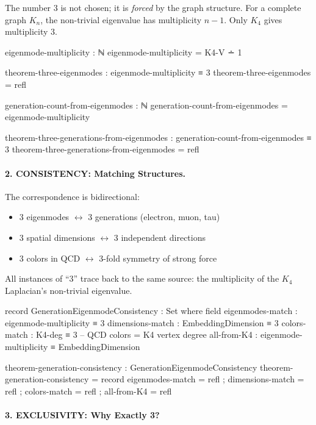 \documentclass[11pt,a4paper]{book}
\begin{document}
The number 3 is not chosen; it is \emph{forced} by the graph structure. For a complete graph $K_n$, the non-trivial eigenvalue has multiplicity $n-1$. Only $K_4$ gives multiplicity 3.

\begin{code}
eigenmode-multiplicity : ℕ
eigenmode-multiplicity = K4-V ∸ 1

theorem-three-eigenmodes : eigenmode-multiplicity ≡ 3
theorem-three-eigenmodes = refl

generation-count-from-eigenmodes : ℕ
generation-count-from-eigenmodes = eigenmode-multiplicity

theorem-three-generations-from-eigenmodes : generation-count-from-eigenmodes ≡ 3
theorem-three-generations-from-eigenmodes = refl
\end{code}

\paragraph{2. CONSISTENCY: Matching Structures.}

The correspondence is bidirectional:
\begin{itemize}
\item 3 eigenmodes $\leftrightarrow$ 3 generations (electron, muon, tau)
\item 3 spatial dimensions $\leftrightarrow$ 3 independent directions
\item 3 colors in QCD $\leftrightarrow$ 3-fold symmetry of strong force
\end{itemize}

All instances of ``3'' trace back to the same source: the multiplicity of the $K_4$ Laplacian's non-trivial eigenvalue.

\begin{code}
record GenerationEigenmodeConsistency : Set where
  field
    eigenmodes-match : eigenmode-multiplicity ≡ 3
    dimensions-match : EmbeddingDimension ≡ 3
    colors-match     : K4-deg ≡ 3  -- QCD colors = K4 vertex degree
    all-from-K4      : eigenmode-multiplicity ≡ EmbeddingDimension

theorem-generation-consistency : GenerationEigenmodeConsistency
theorem-generation-consistency = record
  { eigenmodes-match = refl
  ; dimensions-match = refl
  ; colors-match     = refl
  ; all-from-K4      = refl
  }
\end{code}

\paragraph{3. EXCLUSIVITY: Why Exactly 3?}
\end{document}
